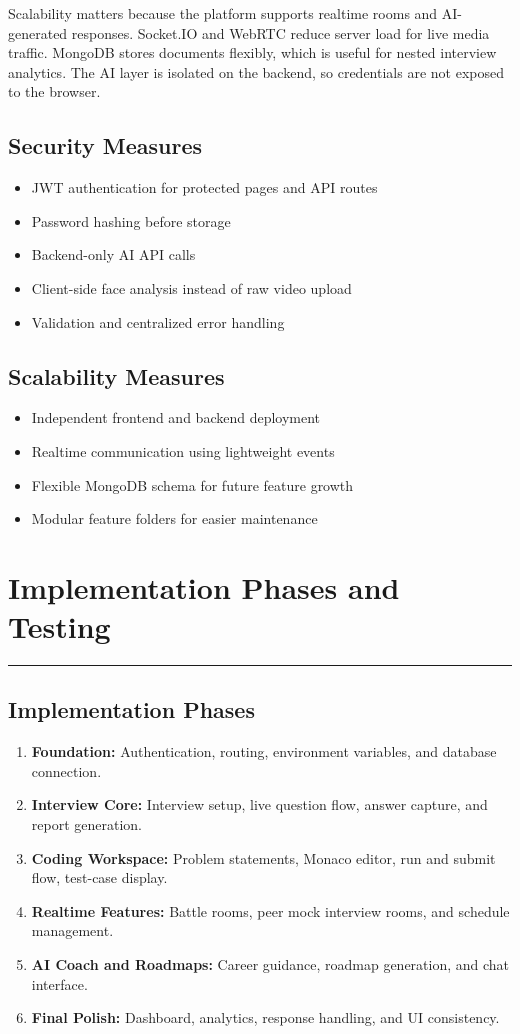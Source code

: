 ﻿\documentclass[12pt,a4paper]{article}
\newcommand{\sectionline}{\vspace{0.4em}\hrule\vspace{0.8em}}
\begin{document}
Scalability matters because the platform supports realtime rooms and AI-generated responses. Socket.IO and WebRTC reduce server load for live media traffic. MongoDB stores documents flexibly, which is useful for nested interview analytics. The AI layer is isolated on the backend, so credentials are not exposed to the browser.

\subsection{Security Measures}
\begin{itemize}
  \item JWT authentication for protected pages and API routes
  \item Password hashing before storage
  \item Backend-only AI API calls
  \item Client-side face analysis instead of raw video upload
  \item Validation and centralized error handling
\end{itemize}

\subsection{Scalability Measures}
\begin{itemize}
  \item Independent frontend and backend deployment
  \item Realtime communication using lightweight events
  \item Flexible MongoDB schema for future feature growth
  \item Modular feature folders for easier maintenance
\end{itemize}

\section{Implementation Phases and Testing}
\sectionline
\subsection{Implementation Phases}
\begin{enumerate}
  \item \textbf{Foundation:} Authentication, routing, environment variables, and database connection.
  \item \textbf{Interview Core:} Interview setup, live question flow, answer capture, and report generation.
  \item \textbf{Coding Workspace:} Problem statements, Monaco editor, run and submit flow, test-case display.
  \item \textbf{Realtime Features:} Battle rooms, peer mock interview rooms, and schedule management.
  \item \textbf{AI Coach and Roadmaps:} Career guidance, roadmap generation, and chat interface.
  \item \textbf{Final Polish:} Dashboard, analytics, response handling, and UI consistency.
\end{enumerate}
\end{document}
